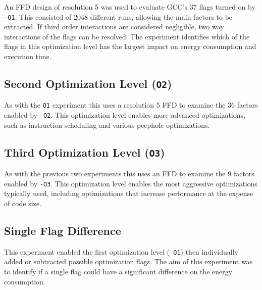\documentclass[twocolumn]{article}
\begin{document}
An FFD design of resolution 5 was used to evaluate GCC's 37 flags turned on by \texttt{-O1}. This consisted of 2048 different runs, allowing the main factors to be extracted. If third order interactions are considered negligible, two way interactions of the flags can be resolved. The experiment identifies which of the flags in this optimization level has the largest impact on energy consumption and execution time.

\subsection*{Second Optimization Level (\texttt{O2})}

As with the \texttt{O1} experiment this uses a resolution 5 FFD to examine the 36 factors enabled by \texttt{-O2}. This optimization level enables more advanced optimizations, such as instruction scheduling and various peephole optimizations.

\subsection*{Third Optimization Level (\texttt{O3})}

As with the previous two experiments this uses an FFD to examine the 9 factors enabled by \texttt{-O3}. This optimization level enables the most aggressive optimizations typically used, including optimizations that increase performance at the expense of code size.



\subsection*{Single Flag Difference}

This experiment enabled the first optimization level (\texttt{-O1}) then individually added or subtracted possible optimization flags. The aim of this experiment was to identify if a single flag could have a significant difference on the energy consumption.
\end{document}
